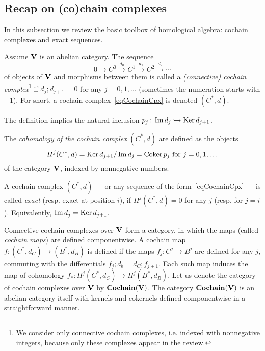 \subsection{Recap on (co)chain complexes}\label{subsecMathCochainRecap}

In this subsection we review the basic toolbox of homological algebra: cochain complexes and exact sequences.

\begin{defin}\label{definCochainCpx}
Assume $\mathbf{V}$ is an abelian category. The sequence
\begin{equation}\label{eqCochainCpx}
0\to C^0\stackrel{d_0}{\to} C^1 \stackrel{d_1}{\to} C^2 \stackrel{d_2}{\to}\cdots
\end{equation}
of objects of $\mathbf{V}$ and morphisms between them is called a \emph{(connective) cochain complex}\footnote{We consider only connective cochain complexes, i.e. indexed with nonnegative integers, because only these complexes appear in the review.} if $d_j;d_{j+1}=0$ for any $j=0,1,\ldots$ (sometimes the numeration starts with $-1$). For short, a cochain complex~\eqref{eqCochainCpx} is denoted $(C^*,d)$.
\end{defin}

The definition implies the natural inclusion $p_j\colon \operatorname{Im} d_j\hookrightarrow \operatorname{Ker} d_{j+1}$.

\begin{defin}\label{definCohomologyCochain}
The \emph{cohomology of the cochain complex} $(C^*,d)$ are defined as the objects
\[
H^j(C^*,d)=\operatorname{Ker} d_{j+1}/\operatorname{Im} d_j = \operatorname{Coker} p_j \mbox{ for }j=0,1,\ldots
\]
of the category $\mathbf{V}$, indexed by nonnegative numbers.
\end{defin}

A cochain complex $(C^*,d)$ --- or any sequence of the form~\eqref{eqCochainCpx} --- is called \emph{exact} (resp. exact at position $i$), if $H^j(C^*,d)=0$ for any $j$ (resp. for $j=i$). Equivalently, $\operatorname{Im} d_j=\operatorname{Ker} d_{j+1}$.

\begin{con}\label{conCategoryCochain}
Connective cochain complexes over $\mathbf{V}$ form a category, in which the maps (called \emph{cochain maps}) are defined componentwise. A cochain map $f\colon (C^*,d_C)\to (B^*,d_B)$ is defined if the maps $f_j\colon C^j\to B^j$ are defined for any $j$, commuting with the differentials $f_j;d_b=d_C;f_{j+1}$. Each such map induces the map of cohomology $f_*\colon H^j(C^*,d_C)\to H^j(B^*,d_B)$. Let us denote the category of cochain complexes over $\mathbf{V}$ by $\mathbf{Cochain}(\mathbf{V})$. The category $\mathbf{Cochain}(\mathbf{V})$ is an abelian category itself with kernels and cokernels defined componentwise in a straightforward manner.
\end{con}

